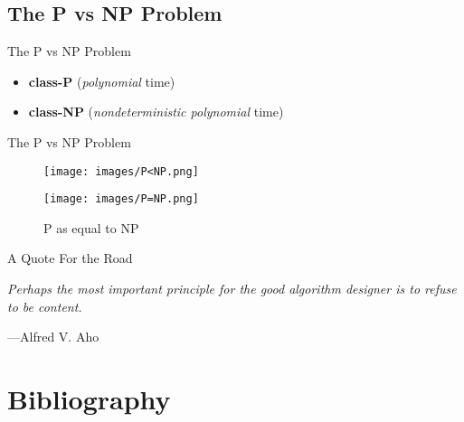 \documentclass[aspectratio=169]{beamer}
\begin{document}
\subsection{The P vs NP Problem}

\begin{frame}{The P vs NP Problem} \pause
    \begin{itemize}
        \item \textbf{class-P} (\textit{polynomial} time) \pause
        \item \textbf{class-NP} (\textit{nondeterministic polynomial} time)
    \end{itemize}
\end{frame}

\begin{frame}{The P vs NP Problem} \pause
    \begin{figure}
        \begin{minipage}{0.5\textwidth}
            \begin{center}
                \texttt{[image: images/P<NP.png]}
                \caption{P as a subset of NP} \pause
            \end{center}
        \end{minipage}%
        \begin{minipage}{0.5\textwidth}
            \begin{center}
                \texttt{[image: images/P=NP.png]}
                \caption{P as equal to NP}
            \end{center}
        \end{minipage}
    \end{figure}
\end{frame}

\begin{frame}{A Quote For the Road} \pause
    \begin{center}
        \begin{minipage}{0.8\textwidth}
            \textit{Perhaps the most important principle for the good algorithm designer is to refuse to be content.}

            \hspace{1cm}---Alfred V. Aho
        \end{minipage}
    \end{center}
\end{frame}

\section{Bibliography}
\end{document}

